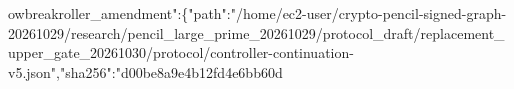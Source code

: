 \documentclass[10pt]{article}
\begin{document}
owbreak{}r\allowbreak{}o\allowbreak{}l\allowbreak{}l\allowbreak{}e\allowbreak{}r\allowbreak{}\_\allowbreak{}a\allowbreak{}m\allowbreak{}e\allowbreak{}n\allowbreak{}d\allowbreak{}m\allowbreak{}e\allowbreak{}n\allowbreak{}t\allowbreak{}"\allowbreak{}:\allowbreak{}\{\allowbreak{}"\allowbreak{}p\allowbreak{}a\allowbreak{}t\allowbreak{}h\allowbreak{}"\allowbreak{}:\allowbreak{}"\allowbreak{}/\allowbreak{}h\allowbreak{}o\allowbreak{}m\allowbreak{}e\allowbreak{}/\allowbreak{}e\allowbreak{}c\allowbreak{}2\allowbreak{}-\allowbreak{}u\allowbreak{}s\allowbreak{}e\allowbreak{}r\allowbreak{}/\allowbreak{}c\allowbreak{}r\allowbreak{}y\allowbreak{}p\allowbreak{}t\allowbreak{}o\allowbreak{}-\allowbreak{}p\allowbreak{}e\allowbreak{}n\allowbreak{}c\allowbreak{}i\allowbreak{}l\allowbreak{}-\allowbreak{}s\allowbreak{}i\allowbreak{}g\allowbreak{}n\allowbreak{}e\allowbreak{}d\allowbreak{}-\allowbreak{}g\allowbreak{}r\allowbreak{}a\allowbreak{}p\allowbreak{}h\allowbreak{}-\allowbreak{}2\allowbreak{}0\allowbreak{}2\allowbreak{}6\allowbreak{}1\allowbreak{}0\allowbreak{}2\allowbreak{}9\allowbreak{}/\allowbreak{}r\allowbreak{}e\allowbreak{}s\allowbreak{}e\allowbreak{}a\allowbreak{}r\allowbreak{}c\allowbreak{}h\allowbreak{}/\allowbreak{}p\allowbreak{}e\allowbreak{}n\allowbreak{}c\allowbreak{}i\allowbreak{}l\allowbreak{}\_\allowbreak{}l\allowbreak{}a\allowbreak{}r\allowbreak{}g\allowbreak{}e\allowbreak{}\_\allowbreak{}p\allowbreak{}r\allowbreak{}i\allowbreak{}m\allowbreak{}e\allowbreak{}\_\allowbreak{}2\allowbreak{}0\allowbreak{}2\allowbreak{}6\allowbreak{}1\allowbreak{}0\allowbreak{}2\allowbreak{}9\allowbreak{}/\allowbreak{}p\allowbreak{}r\allowbreak{}o\allowbreak{}t\allowbreak{}o\allowbreak{}c\allowbreak{}o\allowbreak{}l\allowbreak{}\_\allowbreak{}d\allowbreak{}r\allowbreak{}a\allowbreak{}f\allowbreak{}t\allowbreak{}/\allowbreak{}r\allowbreak{}e\allowbreak{}p\allowbreak{}l\allowbreak{}a\allowbreak{}c\allowbreak{}e\allowbreak{}m\allowbreak{}e\allowbreak{}n\allowbreak{}t\allowbreak{}\_\allowbreak{}u\allowbreak{}p\allowbreak{}p\allowbreak{}e\allowbreak{}r\allowbreak{}\_\allowbreak{}g\allowbreak{}a\allowbreak{}t\allowbreak{}e\allowbreak{}\_\allowbreak{}2\allowbreak{}0\allowbreak{}2\allowbreak{}6\allowbreak{}1\allowbreak{}0\allowbreak{}3\allowbreak{}0\allowbreak{}/\allowbreak{}p\allowbreak{}r\allowbreak{}o\allowbreak{}t\allowbreak{}o\allowbreak{}c\allowbreak{}o\allowbreak{}l\allowbreak{}/\allowbreak{}c\allowbreak{}o\allowbreak{}n\allowbreak{}t\allowbreak{}r\allowbreak{}o\allowbreak{}l\allowbreak{}l\allowbreak{}e\allowbreak{}r\allowbreak{}-\allowbreak{}c\allowbreak{}o\allowbreak{}n\allowbreak{}t\allowbreak{}i\allowbreak{}n\allowbreak{}u\allowbreak{}a\allowbreak{}t\allowbreak{}i\allowbreak{}o\allowbreak{}n\allowbreak{}-\allowbreak{}v\allowbreak{}5\allowbreak{}.\allowbreak{}j\allowbreak{}s\allowbreak{}o\allowbreak{}n\allowbreak{}"\allowbreak{},\allowbreak{}"\allowbreak{}s\allowbreak{}h\allowbreak{}a\allowbreak{}2\allowbreak{}5\allowbreak{}6\allowbreak{}"\allowbreak{}:\allowbreak{}"\allowbreak{}d\allowbreak{}0\allowbreak{}0\allowbreak{}b\allowbreak{}e\allowbreak{}8\allowbreak{}a\allowbreak{}9\allowbreak{}e\allowbreak{}4\allowbreak{}b\allowbreak{}1\allowbreak{}2\allowbreak{}f\allowbreak{}d\allowbreak{}4\allowbreak{}e\allowbreak{}6\allowbreak{}b\allowbreak{}b\allowbreak{}6\allowbreak{}0\allowbreak{}d\allowbreak{}
\end{document}
